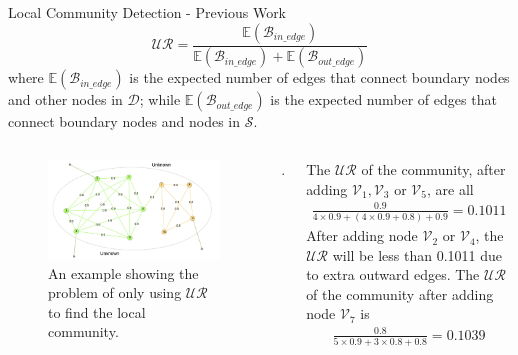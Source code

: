 \documentclass[9pt]{beamer}
\begin{document}
\begin{frame}{Local Community Detection - Previous Work}
\small
\begin{equation}
\mathcal{UR} = \frac{\mathbb{E}(\mathcal{B}_{in\_edge})}{\mathbb{E}(\mathcal{B}_{in\_edge})+\mathbb{E}(\mathcal{B}_{out\_edge})}
\end{equation}
where $\mathbb{E}(\mathcal{B}_{in\_edge})$ is the expected number of edges that connect boundary nodes and other nodes in $\mathcal{D}$; while $\mathbb{E}(\mathcal{B}_{out\_edge})$ is the expected number of edges that connect boundary nodes and nodes in $\mathcal{S}$.


\begin{columns}[T,onlytextwidth]
      \begin{figure}
      \centering
      \includegraphics[scale = 0.075]{toy_example.jpeg}
      \caption{An example showing the problem of only using $\mathcal{UR}$ to find the local community.}
      \label{problem_example}
      \end{figure}

    .
    
     The $\mathcal{UR}$ of the community, after adding $\mathcal{V}_1, \mathcal{V}_3$ or $\mathcal{V}_5$, are all 
\begin{align*}
\frac{0.9}{4\times0.9+(4\times0.9+0.8)+0.9}=0.1011
\end{align*}
\newline
After adding node $\mathcal{V}_2$ or $\mathcal{V}_4$, the $\mathcal{UR}$ will be less than 0.1011 due to extra outward edges. The $\mathcal{UR}$ of the community after adding node $\mathcal{V}_7$ is 
\begin{align*}
\frac{0.8}{5\times0.9+3\times0.8+0.8}=0.1039
\end{align*}
    
  \end{columns}

\end{frame}
\end{document}
